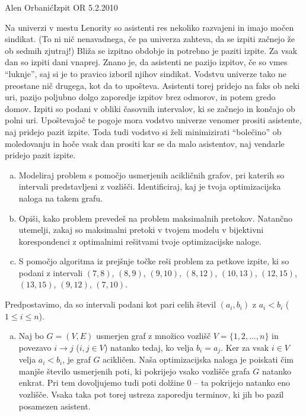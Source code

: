 \begin{naloga}{Alen Orbanić}{Izpit OR 5.2.2010}
\begin{vprasanje}
Na univerzi v mestu Lenority so asistenti res nekoliko razvajeni
in imajo močen sindikat.
(To ni nič nenavadnega, če pa univerza zahteva,
da se izpiti začnejo že ob sedmih zjutraj!)
Bliža se izpitno obdobje in potrebno je paziti izpite.
Za vsak dan so izpiti dani vnaprej.
Znano je, da asistenti ne pazijo izpitov, če so vmes ``luknje'',
saj si je to pravico izboril njihov sindikat.
Vodstvu univerze tako ne preostane nič drugega, kot da to upošteva.
Asistenti torej pridejo na faks ob neki uri,
pazijo poljubno dolgo zaporedje izpitov brez odmorov, in potem gredo domov.
Izpiti so podani v obliki časovnih intervalov,
ki se začnejo in končajo ob polni uri.
Upoštevajoč te pogoje mora vodstvo univerze venomer prositi asistente,
naj pridejo pazit izpite.
Toda tudi vodstvo si želi minimizirati ``bolečino'' ob moledovanju
in hoče vsak dan prositi kar se da malo asistentov,
naj vendarle pridejo pazit izpite.

\begin{enumerate}[(a)]
\item Modeliraj problem s pomočjo usmerjenih acikličnih grafov,
pri katerih so intervali predstavljeni z vozlišči.
Identificiraj, kaj je tvoja optimizacijska naloga na takem grafu.

\item Opiši, kako problem prevedeš na problem maksimalnih pretokov.
Natančno utemelji,
zakaj so maksimalni pretoki v tvojem modelu v bijektivni korespondenci
z optimalnimi rešitvami tvoje optimizacijske naloge.

\item S pomočjo algoritma iz prejšnje točke reši problem za petkove izpite,
ki so podani z intervali $(7, 8)$, $(8, 9)$, $(9, 10)$, $(8, 12)$,
$(10, 13)$, $(12, 15)$, $(13, 15)$, $(9, 12)$, $(7, 10)$.
\end{enumerate}
\end{vprasanje}

\begin{odgovor}
Predpostavimo,
da so intervali podani kot pari celih števil $(a_i, b_i)$ z $a_i < b_i$
($1 \le i \le n$).

\begin{enumerate}[(a)]
\item Naj bo $G = (V, E)$ usmerjen graf
z množico vozlišč $V = \{1, 2, \dots, n\}$
in povezavo $i \to j$ ($i, j \in V$) natanko tedaj,
ko velja $b_i = a_j$.
Ker za vsak $i \in V$ velja $a_i < b_i$, je graf $G$ acikličen.
Naša optimizacijska naloga je poiskati čim manjše število usmerjenih poti,
ki pokrijejo vsako vozlišče grafa $G$ natanko enkrat.
Pri tem dovoljujemo tudi poti dolžine $0$
-- ta pokrijejo natanko eno vozlišče.
Vsaka taka pot torej ustreza zaporedju terminov,
ki jih bo pazil posamezen asistent.


\end{enumerate}
\end{odgovor}
\end{naloga}
